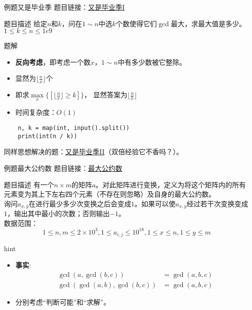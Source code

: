 \begin{frame}[fragile]{例题}{又是毕业季}
  题目链接：\href{https://www.luogu.com.cn/problem/P1372}{又是毕业季I}
  \begin{block}{题目描述}
    给定$n$和$k$，问在$1\sim n$中选$k$个数使得它们$\gcd$最大，求最大值是多少。\\
    $1 \leq k\leq n\le 1e9$
  \end{block}
  \pause
  \begin{exampleblock}{题解}
    \begin{itemize}
      \item \textbf{反向考虑}，即考虑一个数$x$，$1\sim n$中有多少数被它整除。
      \pause
      \item 显然为$\lfloor \frac{n}{x} \rfloor$个
      \item 即求$\max\limits_{x}\{[\lfloor \frac{n}{x} \rfloor \geq k]\}$，
      显然答案为$\lfloor \frac{n}{k} \rfloor$
      \pause
      \item 时间复杂度：$O(1)$
    \end{itemize}
  \end{exampleblock}
  \pause
  \begin{lstlisting}
    n, k = map(int, input().split())
    print(int(n / k))
  \end{lstlisting}
  \pause
  同样思想解决的题：\href{https://www.luogu.com.cn/problem/P1414}{又是毕业季II}（双倍经验它不香吗？）。
\end{frame}

\begin{frame}[fragile]{例题}{最大公约数}
  题目链接：\href{https://www.luogu.com.cn/problem/P7243}{最大公约数}
  \begin{block}{题目描述}
    有一个$n \times m$的矩阵$a$。对此矩阵进行变换，定义为将这个矩阵内的所有元素变为其上下左右四个元素（不存在则忽略）及自身的最大公约数。\\询问$a_{x,y}$在进行最少多少次变换之后会变成$1$。如果可以使$a_{x,y}$经过若干次变换变成$1$，输出其中最小的次数；否则输出$-1$。\\
    \vspace{0.3cm}
    \pause
    数据范围：
    $$
    1\le n,m\le 2\times 10^3, 1\le a_{i,j}\le 10^{18}, 1\le x\le n,1\le y\le m
    $$
  \end{block}
  \vspace{0.3cm}
  \pause
  \begin{alertblock}{hint}
    \begin{itemize}
      \item \textbf{事实}:
      $$
      \begin{aligned}
        &\gcd(a,\gcd(b,c))&=\gcd(a,b,c)\\
        &\gcd(\gcd(a,b),\gcd(b,c))&=\gcd(a,b,c)
      \end{aligned}
      $$
      \item 分别考虑“判断可能”和“求解”。
    \end{itemize}
  \end{alertblock}
\end{frame}

